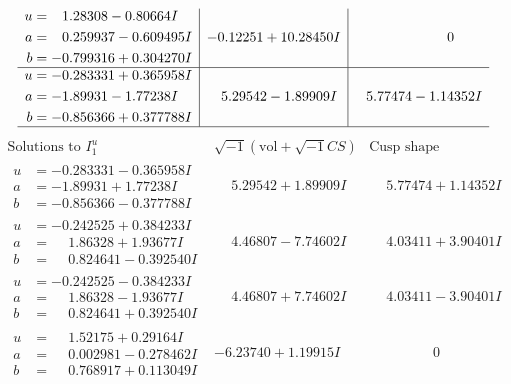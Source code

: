 \documentclass[1p]{elsarticle_modified}
\theoremstyle{definition}
\newcommand{\I}{\sqrt{-1}}
\begin{document}
$$\begin{array}{c|c|c}
\begin{aligned}
u &= \phantom{-}1.28308 - 0.80664 I \\
a &= \phantom{-}0.259937 - 0.609495 I \\
b &= -0.799316 + 0.304270 I\end{aligned}
 & -0.12251 + 10.28450 I & \phantom{-0.000000 } 0 \\ \hline\begin{aligned}
u &= -0.283331 + 0.365958 I \\
a &= -1.89931 - 1.77238 I \\
b &= -0.856366 + 0.377788 I\end{aligned}
 & \phantom{-}5.29542 - 1.89909 I & \phantom{-}5.77474 - 1.14352 I\\
 \hline 
 \end{array}$$\newpage$$\begin{array}{c|c|c}  
\text{Solutions to }I^u_{1}& \I (\text{vol} + \sqrt{-1}CS) & \text{Cusp shape}\\
 \hline 
\begin{aligned}
u &= -0.283331 - 0.365958 I \\
a &= -1.89931 + 1.77238 I \\
b &= -0.856366 - 0.377788 I\end{aligned}
 & \phantom{-}5.29542 + 1.89909 I & \phantom{-}5.77474 + 1.14352 I \\ \hline\begin{aligned}
u &= -0.242525 + 0.384233 I \\
a &= \phantom{-}1.86328 + 1.93677 I \\
b &= \phantom{-}0.824641 - 0.392540 I\end{aligned}
 & \phantom{-}4.46807 - 7.74602 I & \phantom{-}4.03411 + 3.90401 I \\ \hline\begin{aligned}
u &= -0.242525 - 0.384233 I \\
a &= \phantom{-}1.86328 - 1.93677 I \\
b &= \phantom{-}0.824641 + 0.392540 I\end{aligned}
 & \phantom{-}4.46807 + 7.74602 I & \phantom{-}4.03411 - 3.90401 I \\ \hline\begin{aligned}
u &= \phantom{-}1.52175 + 0.29164 I \\
a &= \phantom{-}0.002981 - 0.278462 I \\
b &= \phantom{-}0.768917 + 0.113049 I\end{aligned}
 & -6.23740 + 1.19915 I & \phantom{-0.000000 } 0 \\ \hline\begin{aligned}

\end{aligned}
\end{array}$$
\end{document}
